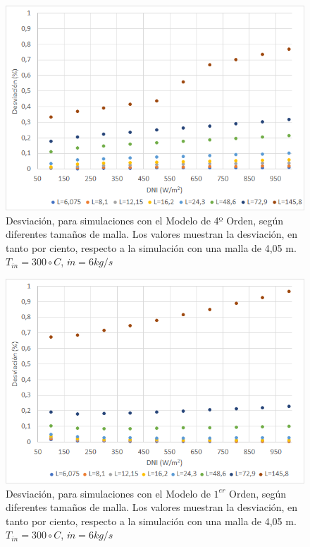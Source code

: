 \begin{figure}[!h]
\includegraphics[width=0.9\linewidth]{images/desviacionmodel4malla.png}
\caption{Desviación, para simulaciones con el Modelo de 4º Orden, según diferentes tamaños de malla. Los valores muestran la desviación, en tanto por ciento, respecto a la simulación con una malla de 4,05 m. $T_{in}=300 \circ C$, $\dot m = 6 kg/s$} 
\label{fig:desviacionmodel4}
\end{figure}

\begin{figure}[!h]
\includegraphics[width=0.9\linewidth]{images/desviacionmodel1malla.png}
\caption{Desviación, para simulaciones con el Modelo de $1^{er}$ Orden, según diferentes tamaños de malla. Los valores muestran la desviación, en tanto por ciento, respecto a la simulación con una malla de 4,05 m. $T_{in}=300 \circ C$, $\dot m = 6 kg/s$} 
\label{fig:desviacionmodel1}
\end{figure}

